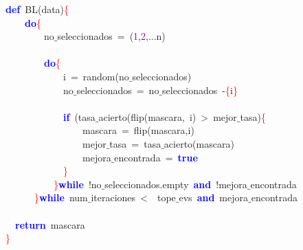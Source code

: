 \noindent
\mbox{}\textbf{\textcolor{Blue}{def}}\ BL\textcolor{BrickRed}{(}data\textcolor{BrickRed}{)}\textcolor{Red}{\{} \\
\mbox{}\ \ \ \ \textbf{\textcolor{Blue}{do}}\textcolor{Red}{\{} \\
\mbox{}\ \ \ \ \ \ \ \ no$\_$seleccionados\ \textcolor{BrickRed}{=}\ \textcolor{BrickRed}{(}\textcolor{Purple}{1}\textcolor{BrickRed}{,}\textcolor{Purple}{2}\textcolor{BrickRed}{,...}n\textcolor{BrickRed}{)} \\
\mbox{} \\
\mbox{}\ \ \ \ \ \ \ \ \textbf{\textcolor{Blue}{do}}\textcolor{Red}{\{} \\
\mbox{}\ \ \ \ \ \ \ \ \ \ \ \ i\ \textcolor{BrickRed}{=}\ random\textcolor{BrickRed}{(}no$\_$seleccionados\textcolor{BrickRed}{)} \\
\mbox{}\ \ \ \ \ \ \ \ \ \ \ \ no$\_$seleccionados\ \textcolor{BrickRed}{=}\ no$\_$seleccionados\ \textcolor{BrickRed}{-}\textcolor{Red}{\{}i\textcolor{Red}{\}} \\
\mbox{} \\
\mbox{}\ \ \ \ \ \ \ \ \ \ \ \ \textbf{\textcolor{Blue}{if}}\ \textcolor{BrickRed}{(}tasa$\_$acierto\textcolor{BrickRed}{(}flip\textcolor{BrickRed}{(}mascara\textcolor{BrickRed}{,}\ i\textcolor{BrickRed}{)}\ \textcolor{BrickRed}{\textgreater{}}\ mejor$\_$tasa\textcolor{BrickRed}{)}\textcolor{Red}{\{} \\
\mbox{}\ \ \ \ \ \ \ \ \ \ \ \ \ \ \ \ mascara\ \textcolor{BrickRed}{=}\ flip\textcolor{BrickRed}{(}mascara\textcolor{BrickRed}{,}i\textcolor{BrickRed}{)} \\
\mbox{}\ \ \ \ \ \ \ \ \ \ \ \ \ \ \ \ mejor$\_$tasa\ \textcolor{BrickRed}{=}\ tasa$\_$acierto\textcolor{BrickRed}{(}mascara\textcolor{BrickRed}{)} \\
\mbox{}\ \ \ \ \ \ \ \ \ \ \ \ \ \ \ \ mejora$\_$encontrada\ \textcolor{BrickRed}{=}\ \textbf{\textcolor{Blue}{true}} \\
\mbox{}\ \ \ \ \ \ \ \ \ \ \ \ \textcolor{Red}{\}} \\
\mbox{}\ \ \ \ \ \ \ \ \ \ \textcolor{Red}{\}}\textbf{\textcolor{Blue}{while}}\ \textcolor{BrickRed}{!}no$\_$seleccionados\textcolor{BrickRed}{.}empty\ \textbf{\textcolor{Blue}{and}}\ \textcolor{BrickRed}{!}mejora$\_$encontrada \\
\mbox{}\ \ \ \ \ \ \textcolor{Red}{\}}\textbf{\textcolor{Blue}{while}}\ num$\_$iteraciones\ \textcolor{BrickRed}{\textless{}}\ \ tope$\_$evs\ \textbf{\textcolor{Blue}{and}}\ mejora$\_$encontrada \\
\mbox{} \\
\mbox{}\ \ \textbf{\textcolor{Blue}{return}}\ mascara \\
\mbox{}\textcolor{Red}{\}} \\
\mbox{}
